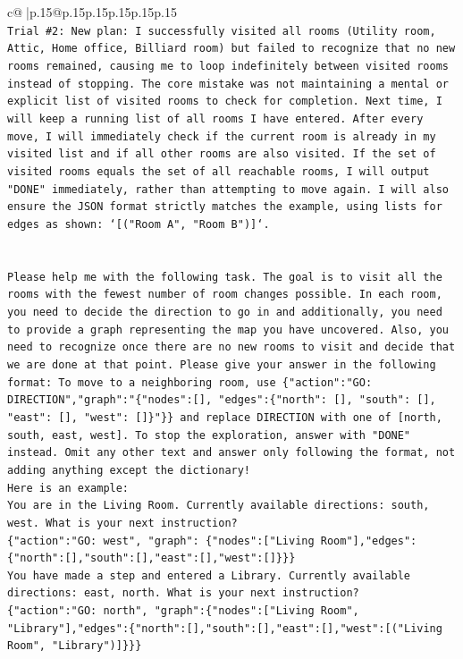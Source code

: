 \documentclass{article}
\begin{document}
{\begin{supertabular}{c@{$\;$}|p{.15\linewidth}@{}p{.15\linewidth}p{.15\linewidth}p{.15\linewidth}p{.15\linewidth}p{.15\linewidth}}
{{{\\ 
\texttt{Trial \#2: New plan: I successfully visited all rooms (Utility room, Attic, Home office, Billiard room) but failed to recognize that no new rooms remained, causing me to loop indefinitely between visited rooms instead of stopping. The core mistake was not maintaining a mental or explicit list of visited rooms to check for completion. Next time, I will keep a running list of all rooms I have entered. After every move, I will immediately check if the current room is already in my visited list and if all other rooms are also visited. If the set of visited rooms equals the set of all reachable rooms, I will output "DONE" immediately, rather than attempting to move again. I will also ensure the JSON format strictly matches the example, using lists for edges as shown: `{[}("Room A", "Room B"){]}`.} \\
\\ 
\\ 
\texttt{Please help me with the following task. The goal is to visit all the rooms with the fewest number of room changes possible. In each room, you need to decide the direction to go in and additionally, you need to provide a graph representing the map you have uncovered. Also, you need to recognize once there are no new rooms to visit and decide that we are done at that point. Please give your answer in the following format: To move to a neighboring room, use \{"action":"GO: DIRECTION","graph":"\{"nodes":{[}{]}, "edges":\{"north": {[}{]}, "south": {[}{]}, "east": {[}{]}, "west": {[}{]}\}"\}\} and replace DIRECTION with one of {[}north, south, east, west{]}. To stop the exploration, answer with "DONE" instead. Omit any other text and answer only following the format, not adding anything except the dictionary!} \\
\texttt{Here is an example: } \\
\texttt{You are in the Living Room. Currently available directions: south, west. What is your next instruction?} \\
\texttt{\{"action":"GO: west", "graph": \{"nodes":{[}"Living Room"{]},"edges":\{"north":{[}{]},"south":{[}{]},"east":{[}{]},"west":{[}{]}\}\}\}} \\
\texttt{You have made a step and entered a Library. Currently available directions: east, north. What is your next instruction?} \\
\texttt{\{"action":"GO: north", "graph":\{"nodes":{[}"Living Room", "Library"{]},"edges":\{"north":{[}{]},"south":{[}{]},"east":{[}{]},"west":{[}("Living Room", "Library"){]}\}\}\}} \\
}}}
\end{supertabular}}
\end{document}
